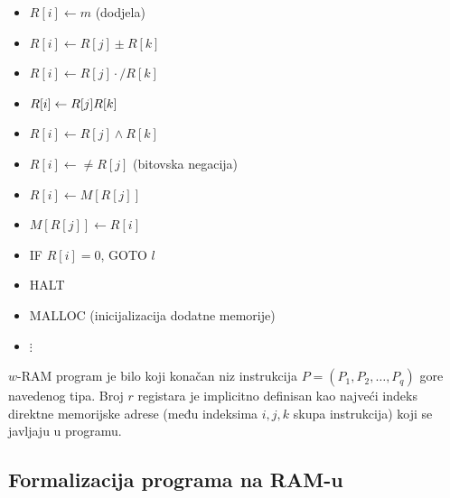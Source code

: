 \begin{itemize}
	\item $R[i] \gets m$ (dodjela)
	\item $R[i] \gets R[j] \pm R[k]$
	\item $R[i] \gets R[j] \cdot/ R[k] $
	\item $R[i] \gets R[j] \/ R[k] $
	\item $R[i] \gets R[j] \wedge R[k]$
	\item $R[i] \gets \neq R[j] $ (bitovska negacija)
	\item $R[i] \gets M[R[j]]$
	\item $M[R[j]] \gets R[i]$
	\item IF $R[i] = 0$, GOTO $l$
	\item HALT
	\item MALLOC (inicijalizacija dodatne memorije)
	\item $\vdots$
\end{itemize}

\begin{definition}
   ${w}$-RAM program je bilo koji konačan niz instrukcija $P = (P_1, P_2,\ldots, P_q)$ gore navedenog tipa. Broj $r$ registara je implicitno definisan kao  najveći indeks direktne memorijske adrese (među indeksima $i, j, k$ skupa instrukcija) koji se javljaju u programu.
\end{definition}

\subsection{Formalizacija programa na RAM-u}


